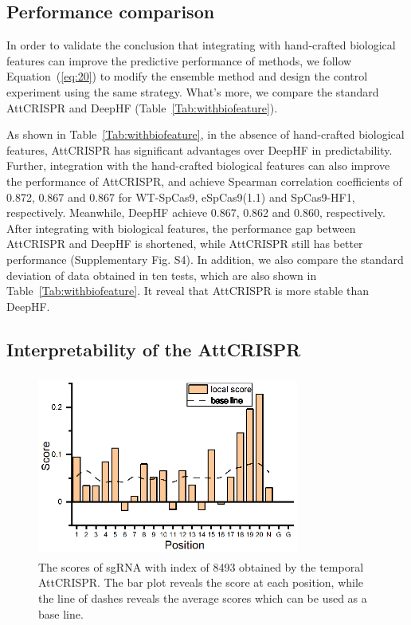 \documentclass{bioinfo}
\begin{document}
\subsection{Performance comparison}\label{section:comparison}

In order to validate the conclusion that integrating with hand-crafted biological features can improve the predictive performance of methods, 
we follow Equation~(\ref{eq:20}) to modify the ensemble method and design the control experiment using the same strategy. 
What's more, we compare the standard AttCRISPR and DeepHF (Table~\ref{Tab:withbiofeature}).

As shown in Table~\ref{Tab:withbiofeature}, in the absence of hand-crafted biological features, AttCRISPR has significant advantages over DeepHF in predictability. 
Further, integration with the hand-crafted biological features can also improve the performance of AttCRISPR, 
and achieve Spearman correlation coefficients of 0.872, 0.867 and 0.867 for WT-SpCas9, eSpCas9(1.1) and SpCas9-HF1, respectively. 
Meanwhile, DeepHF achieve 0.867, 0.862 and 0.860, respectively. 
After integrating with biological features, the performance gap between AttCRISPR and DeepHF is shortened, while AttCRISPR still has better performance (Supplementary Fig. S4). 
In addition, we also compare the standard deviation of data obtained in ten tests, which are also shown in Table~\ref{Tab:withbiofeature}. 
It reveal that AttCRISPR is more stable than DeepHF.

\subsection{Interpretability of the AttCRISPR}\label{section:interpretability}

\begin{figure}[!tpb]
    \centerline{\includegraphics[width=86mm,height=60mm]{local0.eps}}
    \caption{
The scores of sgRNA with index of 8493 obtained by the temporal AttCRISPR. 
The bar plot reveals the score at each position, while the line of dashes reveals the average scores which can be used as a base line. 
}\label{fig:opt}
\end{figure}
\end{document}

